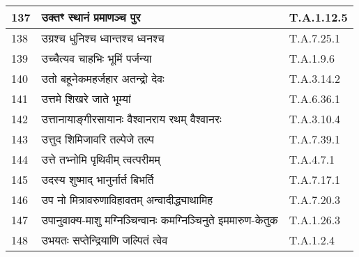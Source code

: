\documentclass[17pt]{extarticle}
\begin{document}
\begin{longtable}{||p{0.4in}||p{4.9in}||p{0.9in}||}
    \hline
        
    137 & उक्तꣳ स्थानं प्रमाणञ्च पुर & T.A.1.12.5       \\
    
    \hline
        
    138 & उग्रश्च धुनिश्च ध्वान्तश्च ध्वनश्च & T.A.7.25.1       \\
    
    \hline
        
    139 & उच्चैत्यव चाहभिः भूमिं पर्जन्या & T.A.1.9.6       \\
    
    \hline
        
    140 & उतो बहूनेकमहर्जहार अतन्द्रो देवः & T.A.3.14.2       \\
    
    \hline
        
    141 & उत्तमे शिखरे जाते भूम्यां & T.A.6.36.1       \\
    
    \hline
        
    142 & उत्तानायाङ्गीरसायानः वैश्वानराय रथम् वैश्वानरः & T.A.3.10.4       \\
    
    \hline
        
    143 & उत्तुद शिमिजावरि तल्पेजे तल्प & T.A.7.39.1       \\
    
    \hline
        
    144 & उत्ते तभ्नोमि पृथिवीम् त्वत्परीमम् & T.A.4.7.1       \\
    
    \hline
        
    145 & उदस्य शुष्माद् भानुर्नार्त बिभर्ति & T.A.7.17.1       \\
    
    \hline
        
    146 & उप नो मित्रावरुणाविहावतम् अन्वादीद्ध्याथामिह & T.A.7.20.3       \\
    
    \hline
        
    147 & उपानुवाक्य{-}माशु मग्निञ्चिन्वानः कमग्निञ्चिनुते इममारुण{-}केतुक & T.A.1.26.3       \\
    
    \hline
        
    148 & उभयतः सप्तेन्द्रियाणि जल्पितं त्वेव & T.A.1.2.4       \\
    
    \hline
        

\end{longtable}
\end{document}
